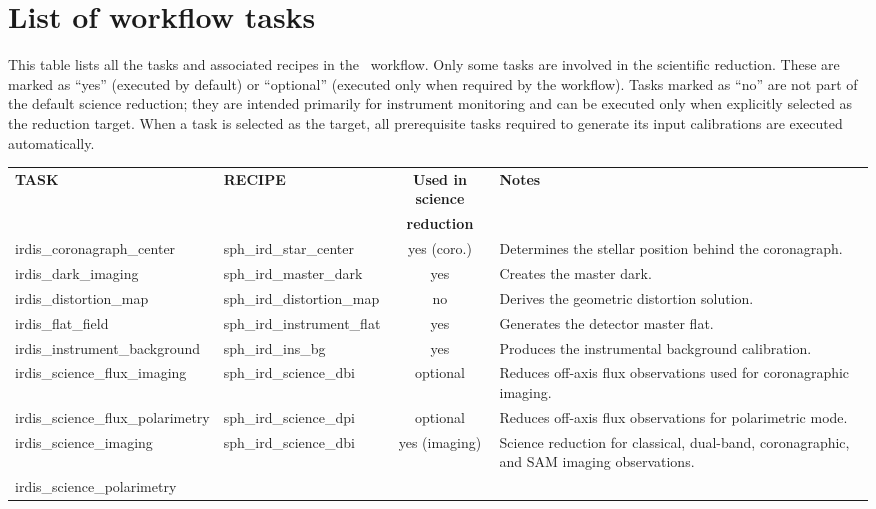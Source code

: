 \section{List of workflow tasks}

This table lists all the tasks and associated recipes in the \instname\ workflow.
Only some tasks are involved in the scientific reduction. These are marked as
``yes'' (executed by default) or ``optional'' (executed only when required by
the workflow). Tasks marked as ``no'' are not part of the default science
reduction; they are intended primarily for instrument monitoring and can be
executed only when explicitly selected as the reduction target. When a task is
selected as the target, all prerequisite tasks required to generate its input
calibrations are executed automatically.

\begin{table}[htbp]
\centering
\scriptsize
\begin{tabular}{|l|l|c|p{7cm}|}
\hline
\textbf{TASK} & \textbf{RECIPE} & \textbf{Used in science} & \textbf{Notes} \\
              &                 & \textbf{reduction} &                \\
\hline
irdis\_coronagraph\_center &
sph\_ird\_star\_center &
yes (coro.) &
Determines the stellar position behind the coronagraph. \\
\hline
irdis\_dark\_imaging &
sph\_ird\_master\_dark &
yes &
Creates the master dark. \\
\hline
irdis\_distortion\_map &
sph\_ird\_distortion\_map &
no &
Derives the geometric distortion solution. \\
\hline
irdis\_flat\_field &
sph\_ird\_instrument\_flat &
yes &
Generates the detector master flat. \\
\hline
irdis\_instrument\_background &
sph\_ird\_ins\_bg &
yes &
Produces the instrumental background calibration. \\
\hline
irdis\_science\_flux\_imaging &
sph\_ird\_science\_dbi &
optional &
Reduces off-axis flux observations used for coronagraphic imaging. \\
\hline
irdis\_science\_flux\_polarimetry &
sph\_ird\_science\_dpi &
optional &
Reduces off-axis flux observations for polarimetric mode. \\
\hline
irdis\_science\_imaging &
sph\_ird\_science\_dbi &
yes (imaging) &
Science reduction for classical, dual-band, coronagraphic, and SAM imaging observations. \\
\hline
irdis\_science\_polarimetry &

\end{tabular}
\end{table}
